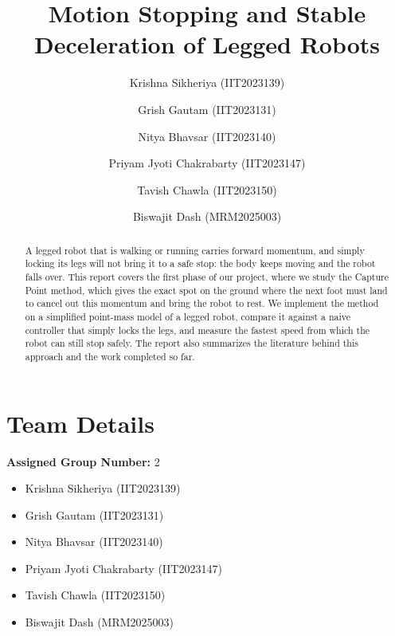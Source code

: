 \documentclass{llncs}
\begin{document}
\title{Motion Stopping and Stable Deceleration of Legged Robots}

\author{Krishna Sikheriya (IIT2023139) \and Grish Gautam (IIT2023131) \and
Nitya Bhavsar (IIT2023140) \and Priyam Jyoti Chakrabarty (IIT2023147) \and
Tavish Chawla (IIT2023150) \and Biswajit Dash (MRM2025003)}


\maketitle

\begin{abstract}
A legged robot that is walking or running carries forward momentum, and simply locking its legs
will not bring it to a safe stop: the body keeps moving and the robot falls over. This report
covers the first phase of our project, where we study the Capture Point method, which gives the
exact spot on the ground where the next foot must land to cancel out this momentum and bring the
robot to rest. We implement the method on a simplified point-mass model of a legged robot,
compare it against a naive controller that simply locks the legs, and measure the fastest speed
from which the robot can still stop safely. The report also summarizes the literature behind this
approach and the work completed so far.
\end{abstract}

\section{Team Details}
\label{sec:team}

\textbf{Assigned Group Number:} 2

\begin{itemize}[leftmargin=1.5cm]
    \item Krishna Sikheriya (IIT2023139)
    \item Grish Gautam (IIT2023131)
    \item Nitya Bhavsar (IIT2023140)
    \item Priyam Jyoti Chakrabarty (IIT2023147)
    \item Tavish Chawla (IIT2023150)
    \item Biswajit Dash (MRM2025003)
\end{itemize}
\end{document}
